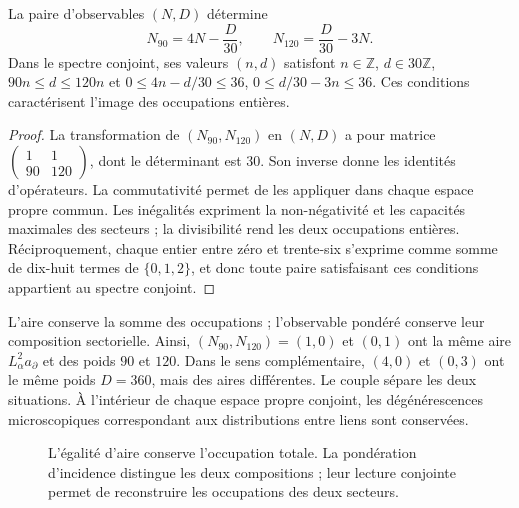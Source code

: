 \begin{theorem}
\label{rev4:ae:recuperacion}
La paire d’observables \((N,D)\) détermine
\begin{equation}
 N_{90}=4N-\frac{D}{30},
 \qquad N_{120}=\frac{D}{30}-3N.
 \label{rev4:ae:inversa}
\end{equation}
Dans le spectre conjoint, ses valeurs \((n,d)\) satisfont \(n\in\mathbb Z\), \(d\in30\mathbb Z\), \(90n\le d\le120n\) et \(0\le4n-d/30\le36\), \(0\le d/30-3n\le36\). Ces conditions caractérisent l'image des occupations entières.
\end{theorem}
\begin{proof}
La transformation de \((N_{90},N_{120})\) en \((N,D)\) a pour matrice
\(\left(\begin{smallmatrix}1&1\\90&120\end{smallmatrix}\right)\),
dont le déterminant est \(30\). Son inverse donne les identités
d’opérateurs. La commutativité permet de les appliquer dans chaque espace propre
commun. Les inégalités expriment la non-négativité et les capacités
maximales des secteurs ; la divisibilité rend les deux occupations entières.
Réciproquement, chaque entier entre zéro et trente-six s’exprime comme
somme de dix-huit termes de \(\{0,1,2\}\), et donc toute paire
satisfaisant ces conditions appartient au spectre conjoint.
\end{proof}

L’aire conserve la somme des occupations ; l’observable pondéré conserve
leur composition sectorielle. Ainsi, \((N_{90},N_{120})=(1,0)\) et \((0,1)\)
ont la même aire \(L_\alpha^2a_\partial\) et des poids \(90\) et \(120\).
Dans le sens complémentaire, \((4,0)\) et \((0,3)\) ont le même poids
\(D=360\), mais des aires différentes. Le couple sépare les deux situations.
À l’intérieur de chaque espace propre conjoint, les dégénérescences
microscopiques correspondant aux distributions entre liens sont conservées.

\begin{figure}[htbp]
\centering
{}
\caption{L'égalité d'aire conserve l'occupation totale. La pondération d'incidence distingue les deux compositions ; leur lecture conjointe permet de reconstruire les occupations des deux secteurs.}
\label{rev4:ae:figura}
\end{figure}

